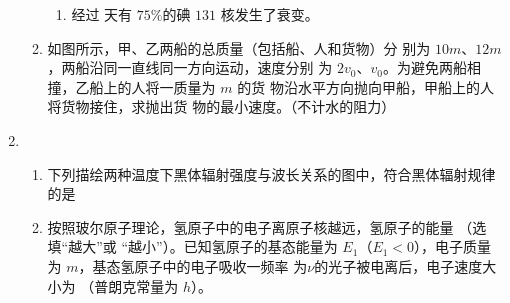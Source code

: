 \begin{enumerate}
\begin{enumerate}
\begin{enumerate}
\item 
经过 \underlinegap 天有 $ 75 \% $的碘 $ 131 $ 核发生了衰变。

\end{enumerate}



\item 
如图所示，甲、乙两船的总质量（包括船、人和货物）分
别为 $ 10 m $、$ 12 m $，两船沿同一直线同一方向运动，速度分别
为 $ 2 v_{0} $、$ v_{0} $。为避免两船相撞，乙船上的人将一质量为 $ m $ 的货
物沿水平方向抛向甲船，甲船上的人将货物接住，求抛出货
物的最小速度。（不计水的阻力）
\begin{figure}[h!]
	\flushright
	
\end{figure}



	
\end{enumerate}


\item 
{}
\begin{enumerate}
	\item
下列描绘两种温度下黑体辐射强度与波长关系的图中，符合黑体辐射规律的是  
\pfourchoices
{}
{}
{}
{}

\item 
按照玻尔原子理论，氢原子中的电子离原子核越远，氢原子的能量 \underlinegap （选填“越大”或
“越小”）。已知氢原子的基态能量为 $ E_{1} $（$ E_{1} <0 $），电子质量为 $ m $，基态氢原子中的电子吸收一频率
为$ \nu $的光子被电离后，电子速度大小为 \underlinegap （普朗克常量为 $ h $）。


\end{enumerate}
\end{enumerate}

